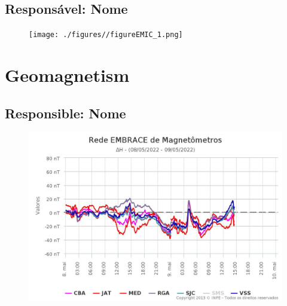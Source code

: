 \documentclass[a4paper, 10pt]{article}
\begin{document}
 \subsection{Responsável: Nome} 
 
\begin{figure}[H]
    
                        \centering
   
                             \texttt{[image: ./figures//figureEMIC\_1.png]}

                        \end{figure}

                     \section{Geomagnetism} 
 \subsection{Responsible: Nome} 
 
\begin{figure}[H]
    
                        \centering
   
                             \includegraphics[width=14cm]{./figures//figureGeomag_0.png}

                        \end{figure}
\end{document}
